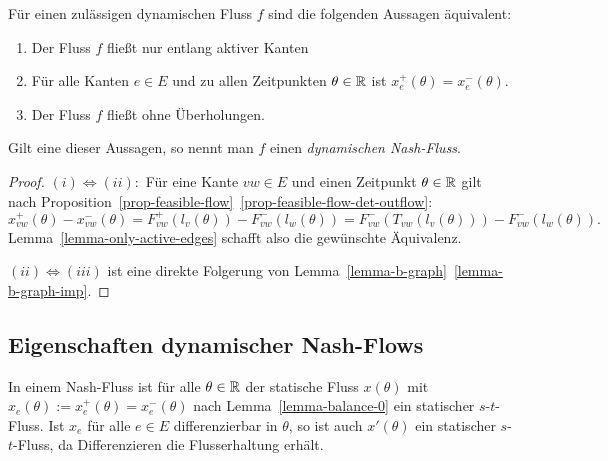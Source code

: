 \begin{theorem}\label{thm-equivalencies-nash-flow}
	Für einen zulässigen dynamischen Fluss $f$ sind die folgenden Aussagen äquivalent:
	\begin{enumerate}[label=(\roman*)]
		\item Der Fluss $f$ fließt nur entlang aktiver Kanten
		\item Für alle Kanten $e\in E$ und zu allen Zeitpunkten $\theta\in\mathbb{R}$ ist $x_e^+(\theta) = x_e^-(\theta)$.
		\item Der Fluss $f$ fließt ohne Überholungen.
	\end{enumerate}
	Gilt eine dieser Aussagen, so nennt man $f$ einen \emph{dynamischen Nash-Fluss}.
\end{theorem}
\begin{proof}
	$(i) \Leftrightarrow (ii):$ Für eine Kante $vw\in E$ und einen Zeitpunkt $\theta\in\mathbb{R}$ gilt nach Proposition~\ref{prop-feasible-flow}~\ref{prop-feasible-flow-det-outflow}:
	$$x_{vw}^+(\theta) - x_{vw}^-(\theta) = F_{vw}^+(l_v(\theta)) - F_{vw}^-(l_w(\theta)) = F_{vw}^-(T_{vw}(l_v(\theta))) - F_{vw}^-(l_w(\theta)).$$
	Lemma~\ref{lemma-only-active-edges} schafft also die gewünschte Äquivalenz.
	
	$(ii) \Leftrightarrow (iii)$ ist eine direkte Folgerung von Lemma~\ref{lemma-b-graph}~\ref{lemma-b-graph-imp}.
\end{proof}

\subsection{Eigenschaften dynamischer Nash-Flows}

\begin{remark}\label{remark-s-t-flow}
	In einem Nash-Fluss ist für alle $\theta\in\mathbb{R}$ der statische Fluss $x(\theta)$ mit $x_e(\theta):=x_e^+(\theta)=x_e^-(\theta)$ nach Lemma~\ref{lemma-balance-0} ein statischer $s$-$t$-Fluss.
	Ist $x_e$ für alle $e\in E$ differenzierbar in $\theta$, so ist auch $x'(\theta)$ ein statischer $s$-$t$-Fluss, da Differenzieren die Flusserhaltung erhält.
\end{remark}


